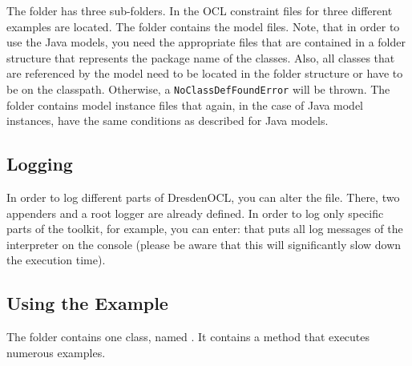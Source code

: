 The  folder has three sub-folders. In
 the OCL constraint files for three different examples
are located. The  folder contains the model files. Note, that 
in order to use the Java models, you need the appropriate  files
that are contained in a folder structure that represents the package name of the
classes. Also, all classes that are referenced by the model need to be located
in the folder structure or have to be on the classpath. Otherwise, a 
\lstinline[breaklines=true]{NoClassDefFoundError} will be thrown. The 
 folder contains model instance files that again, in
the case of Java model instances, have the same conditions as described for 
Java models.


\subsection{Logging}

In order to log different parts of DresdenOCL, you can alter the
 file. There, two appenders and a root logger are 
already defined. In order to log only specific parts of the toolkit, for
example, you can enter: 
 that puts all log messages of the interpreter on the console (please 
be aware that this will significantly slow down the execution time).


\subsection{Using the Example}

The  folder contains one class, named 
. It contains a  method that 
executes numerous examples.

